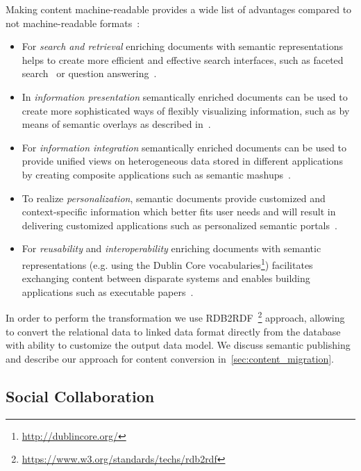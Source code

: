 \documentclass[ngerman,UKenglish,table]{scrbook}
\begin{document}
Making content machine-readable provides a wide list of advantages compared to not machine-readable formats~\cite{khalili2014semantics}:
\begin{itemize}
\item For \emph{search and retrieval} enriching documents with semantic representations helps to create more efficient and effective search interfaces, such as faceted search~\cite{tunkelang2009faceted} or question answering~\cite{Lopez2011}.
\item In \emph{information presentation} semantically enriched documents can be used to create more sophisticated ways of flexibly visualizing information, such as by means of semantic overlays as described in~\cite{Burel2009}.
\item For \emph{information integration} semantically enriched documents can be used to provide unified views on heterogeneous data stored in different applications by creating composite applications such as semantic mashups~\cite{ankolekar2007two}.
\item To realize \emph{personalization}, semantic documents provide customized and context-specific information which better fits user needs and will result in delivering customized applications such as personalized semantic portals~\cite{ecs2007}.
\item For \emph{reusability} and \emph{interoperability} enriching documents with semantic representations (e.g. using the Dublin Core vocabularies\footnote{\url{http://dublincore.org/}}) facilitates exchanging content between disparate systems and enables building applications such as executable papers~\cite{Muller2011}.
\end{itemize}

In order to perform the transformation we use RDB2RDF~\footnote{\url{https://www.w3.org/standards/techs/rdb2rdf}} approach, allowing to convert the relational data to linked data format directly from the database with ability to customize the output data model.
We discuss semantic publishing and describe our approach for content conversion in~\autoref{sec:content_migration}.


\subsection{Social Collaboration}
\end{document}

